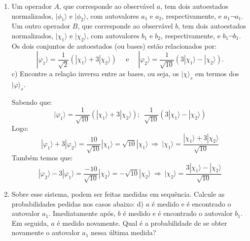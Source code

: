 \begin{enumerate}[start=1,label={\bfseries Q\arabic*.}]
\item[  ] Um operador $A$, que corresponde ao observável $a$, tem dois autoestados normalizados, $|\phi_{1}\rangle$ e $|\phi_{2}\rangle$, com autovalores $a_{1}$ e $a_{2}$, respectivamente, e $a_{1} \neg   a_{1}$. Um outro operador $B$, que corresponde ao observável $b$, tem dois autoestados normalizados, $|\chi_{1}\rangle$ e $|\chi_{2}\rangle$, com autovalores $b_{1}$ e $b_{2}$, respectivamente, e $b_{1} \neg   b_{1}$. Os dois conjuntos de autoestados (ou bases) estão relacionados por:
$$
| \varphi_{1} \rangle = \frac{1}{\sqrt{2}} (| \chi_{1} \rangle + 3 | \chi_{2} \rangle) \quad
\mbox{ e } \quad | \varphi_{2} \rangle = \frac{1}{\sqrt{10}} (3 | \chi_{1} \rangle - | \chi_{2} \rangle).
$$
c) Encontre a relação inversa entre as bases, ou seja, os $ |\chi \rangle_{s} $ em termos dos $ |\varphi \rangle_{s} $.

\resposta Sabendo que:
\begin{equation}
  | \varphi_{1} \rangle = \frac{1}{\sqrt{10}} ( |\chi_{1} \rangle + 3 | \chi_{2} \rangle ) ; \ \ \frac{1}{\sqrt{10}} ( 3 |\chi_{1} \rangle - | \chi_{2} \rangle )
\end{equation}
%
Logo:
%
\begin{equation}
  | \varphi_{1} \rangle + 3 | \varphi_{2} \rangle = \frac{10}{\sqrt{10}} | \chi_{1} \rangle = \sqrt{10} | \chi_{1} \rangle \ \Rightarrow \ | \chi_{1} \rangle = \frac{| \chi_{1} \rangle + 3 | \chi_{2} \rangle}{\sqrt{10}}
\end{equation}
%
Também temos que:
%
\begin{equation}
  | \varphi_{2} \rangle - 3 | \varphi_{1} \rangle = \frac{-10}{\sqrt{10}} | \chi_{2} \rangle = -\sqrt{10} | \chi_{2} \rangle \ \Rightarrow \ | \chi_{2} \rangle = \frac{ 3 | \chi_{1} \rangle - | \chi_{2} \rangle}{\sqrt{10}}
\end{equation}



\item[  ] Sobre esse sistema, podem ser feitas medidas em sequência. Calcule as probabilidades pedidas nos casos abaixo:
d) $a$ é medido e é encontrado o autovalor $a_{1}$. Imediatamente após, $b$ é medido e é encontrado o autovalor $b_{1}$. Em seguida, $a$ é medido novamente. Qual é a probabilidade de se obter novamente o autovalor $a_{1}$ nessa última medida?


\end{enumerate}
